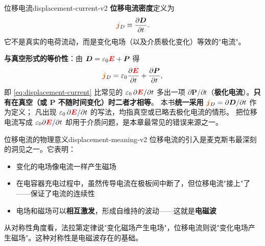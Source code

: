 \documentclass[11pt,a4paper,openany,oneside]{book}
\newcommand{\vecE}{\textcolor{red}{\vect{E}}}
\newcommand{\vecJ}{\textcolor{cororange}{\vect{j}}}
\newcommand{\eps}{\varepsilon}
\newcommand{\vect}[1]{\bm{#1}}
\begin{document}
\begin{definition}{位移电流}{displacement-current-v2}
\textbf{位移电流密度}定义为
\begin{equation}
\vecJ_D \equiv \frac{\partial\vect{D}}{\partial t}.
\label{eq:displacement-current}
\end{equation}
它不是真实的电荷流动，而是变化电场（以及介质极化变化）等效的"电流"。

\textbf{与真空形式的等价性}：由 $\vect D = \eps_0\vecE + \vect{P}$ 得
\[
\vecJ_D = \eps_0\frac{\partial\vecE}{\partial t} + \frac{\partial\vect{P}}{\partial t},
\]
即 \eqref{eq:displacement-current} 比常见的 $\eps_0\,\partial\vecE/\partial t$ 多出一项
$\partial\vect{P}/\partial t$（\textbf{极化电流}）。\textbf{只有在真空（或 $\vect P$ 不随时间变化）时二者才相等}。
本书\textbf{统一采用 $\vecJ_D = \partial\vect{D}/\partial t$} 作为定义；
凡出现 $\eps_0\,\partial\vecE/\partial t$ 的写法，均指真空或已略去极化电流的情形。
把位移电流写成 $\eps_0\partial\vecE/\partial t$ 却用于介质问题，是本章最常见的错误来源之一。
\end{definition}

\begin{insight}{位移电流的物理意义}{displacement-meaning-v2}
位移电流的引入是麦克斯韦最深刻的洞见之一。它表明：
\begin{itemize}
\item 变化的电场像电流一样产生磁场
\item 在电容器充电过程中，虽然传导电流在极板间中断了，但位移电流"接上"了——保证了电流的连续性
\item 电场和磁场可以\textbf{相互激发}，形成自维持的波动——这就是\textbf{电磁波}
\end{itemize}

从对称性角度看，法拉第定律说"变化磁场产生电场"，位移电流则说"变化电场产生磁场"。这种对称性是电磁波存在的基础。
\end{insight}
\end{document}
